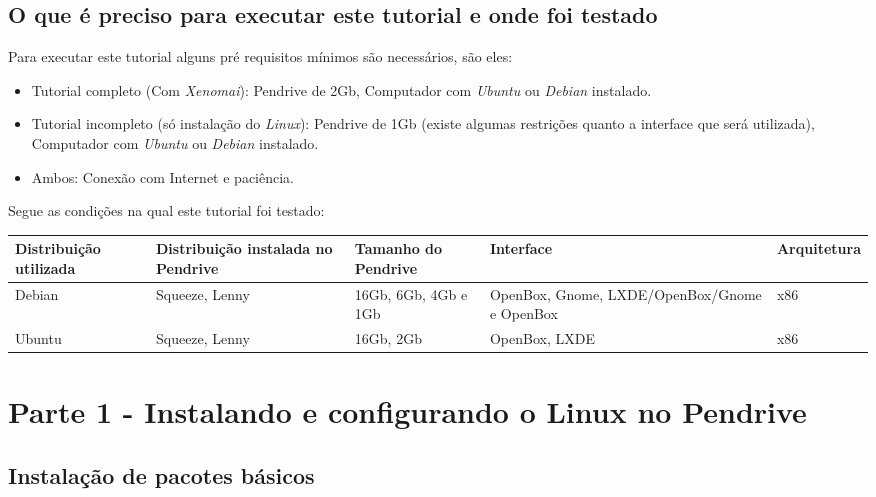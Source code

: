 \documentclass[a4paper,10pt]{article}
\begin{document}
    \subsection{O que é preciso para executar este tutorial e onde foi testado}
      Para executar este tutorial alguns pré requisitos mínimos são necessários, são eles:
      \begin{itemize}
       \item Tutorial completo (Com \emph{Xenomai}): Pendrive de 2Gb, Computador com \emph{Ubuntu} ou \emph{Debian} 
	    instalado.
       \item Tutorial incompleto (só instalação do \emph{Linux}): Pendrive de 1Gb (existe algumas restrições quanto a
	    interface que será utilizada), Computador com \emph{Ubuntu} ou \emph{Debian} instalado.
       \item Ambos: Conexão com Internet e paciência.
      \end{itemize}
      Segue as condições na qual este tutorial foi testado:\\
      \begin{center}
	\begin{tabular}{|p{2cm}|p{2cm}|p{2cm}|p{2cm}|p{2cm}|}
	  \hline
	    Distribuição utilizada & Distribuição instalada no Pendrive & Tamanho do Pendrive & Interface & Arquitetura\\	
	  \hline
	    Debian & Squeeze, Lenny & 16Gb, 6Gb, 4Gb e 1Gb & OpenBox, Gnome, LXDE/OpenBox/Gnome e OpenBox & x86\\
	  \hline 
	    Ubuntu & Squeeze, Lenny & 16Gb, 2Gb & OpenBox, LXDE & x86\\
	  \hline
	\end{tabular}
       \end{center}

\newpage
\section{Parte 1 - Instalando e configurando o Linux no Pendrive}
  \subsection{Instalação de pacotes básicos}
\end{document}

